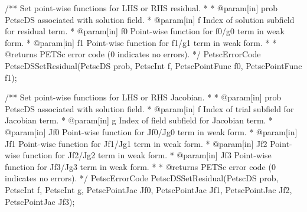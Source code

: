 \begin{cplusplus}
/** Set point-wise functions for LHS or RHS residual.
 *
 * @param[in] prob PetscDS associated with solution field.
 * @param[in] f Index of solution subfield for residual term.
 * @param[in] f0 Point-wise function for f0/g0 term in weak form.
 * @param[in] f1 Point-wise function for f1/g1 term in weak form.
 *
 * @returns PETSc error code (0 indicates no errors).
 */
 PetscErrorCode
 PetscDSSetResidual(PetscDS prob,
                    PetscInt f,
                    PetscPointFunc f0,
                    PetscPointFunc f1);
\end{cplusplus}

\begin{cplusplus}
/** Set point-wise functions for LHS or RHS Jacobian.
 *
 * @param[in] prob PetscDS associated with solution field.
 * @param[in] f Index of trial subfield for Jacobian term.
 * @param[in] g Index of field subfield for Jacobian term.
 * @param[in] Jf0 Point-wise function for Jf0/Jg0 term in weak form.
 * @param[in] Jf1 Point-wise function for Jf1/Jg1 term in weak form.
 * @param[in] Jf2 Point-wise function for Jf2/Jg2 term in weak form.
 * @param[in] Jf3 Point-wise function for Jf3/Jg3 term in weak form.
 *
 * @returns PETSc error code (0 indicates no errors).
 */
 PetscErrorCode
 PetscDSSetResidual(PetscDS prob,
                    PetscInt f,
                    PetscInt g,
                    PetscPointJac Jf0,
                    PetscPointJac Jf1,
                    PetscPointJac Jf2,
                    PetscPointJac Jf3);
\end{cplusplus}




